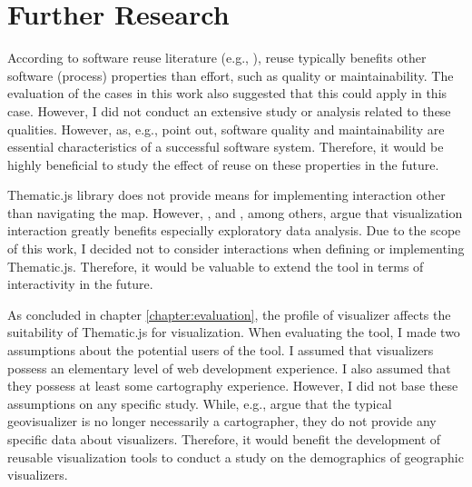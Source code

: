 \section{Further Research}

According to software reuse literature (e.g., \citealt{mohagheghi_quality_2007,frakes_success_1994}), reuse typically benefits other software (process) properties than effort, such as quality or maintainability. The evaluation of the cases in this work also suggested that this could apply in this case. However, I did not conduct an extensive study or analysis related to these qualities. However, as, e.g., \citet{kitchenham_software_1996} point out, software quality and maintainability are essential characteristics of a successful software system. Therefore, it would be highly beneficial to study the effect of reuse on these properties in the future.

Thematic.js library does not provide means for implementing interaction other than navigating the map. However, \citet{andrienko_interactive_1999}, and \citet[chap.~21]{slocum_thematic_2014}, among others, argue that visualization interaction greatly benefits especially exploratory data analysis. Due to the scope of this work, I decided not to consider interactions when defining or implementing Thematic.js. Therefore, it would be valuable to extend the tool in terms of interactivity in the future.

As concluded in chapter \ref{chapter:evaluation}, the profile of visualizer affects the suitability of Thematic.js for visualization. When evaluating the tool, I made two assumptions about the potential users of the tool. I assumed that visualizers possess an elementary level of web development experience. I also assumed that they possess at least some cartography experience. However, I did not base these assumptions on any specific study. While, e.g., \citet{slocum_thematic_2014} argue that the typical geovisualizer is no longer necessarily a cartographer, they do not provide any specific data about visualizers. Therefore, it would benefit the development of reusable visualization tools to conduct a study on the demographics of geographic visualizers. 

